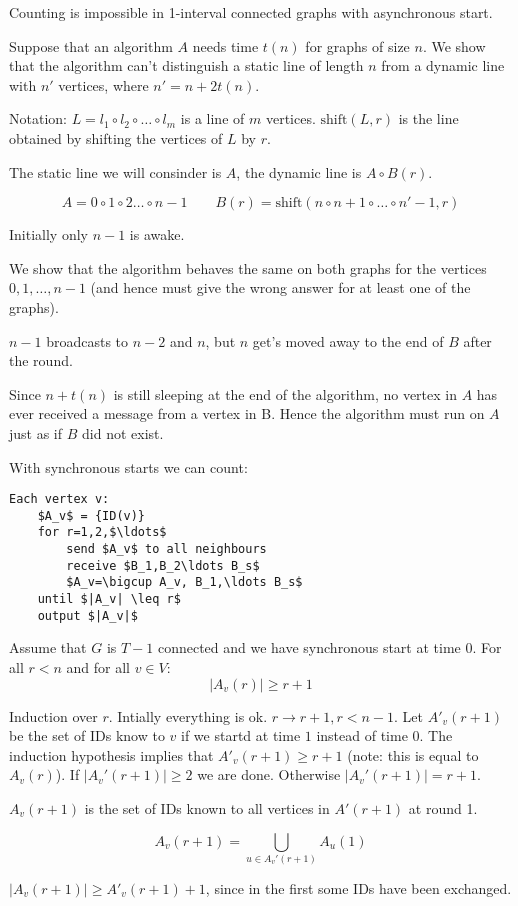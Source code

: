 \begin{thm} Counting is impossible in 1-interval connected graphs with asynchronous start.\end{thm}
\begin{pr} Suppose that an algorithm $A$ needs time $t(n)$ for graphs of size $n$. We show that the algorithm can't distinguish a static line of length $n$ from a dynamic line with $n'$ vertices, where $n'=n+2t(n)$.

Notation: $L=l_1\circ l_2\circ \ldots \circ l_m$ is a line of $m$ vertices. $\text{shift}(L,r)$ is the line obtained by shifting the vertices of $L$ by $r$.

The static line we will consinder is $A$, the dynamic line is $A\circ B(r)$.

\[A = 0\circ 1 \circ 2\ldots \circ n-1 \qquad B(r) = \text{shift}(n\circ n+1\circ \ldots \circ n'-1,r)\]

Initially only $n-1$ is awake.

We show that the algorithm behaves the same on both graphs for the vertices $0,1,\ldots ,n-1$ (and hence must give the wrong answer for at least one of the graphs).


$n-1$ broadcasts to $n-2$ and $n$, but $n$ get's moved away to the end of $B$ after the round.

Since $n+t(n)$ is still sleeping at the end of the algorithm, no vertex in $A$ has ever received a message from a vertex in B. Hence the algorithm must run on $A$ just as if $B$ did not exist.
\end{pr}

With synchronous starts we can count:

\begin{lstlisting}
Each vertex v:
	$A_v$ = {ID(v)}
	for r=1,2,$\ldots$
		send $A_v$ to all neighbours
		receive $B_1,B_2\ldots B_s$
		$A_v=\bigcup A_v, B_1,\ldots B_s$
	until $|A_v| \leq r$
	output $|A_v|$
\end{lstlisting}

\begin{lem} Assume that $G$ is $T-1$ connected and we have synchronous start at time $0$. For all $r<n$ and for all $v\in V$:
\[|A_v(r)| \geq r+1\]
\end{lem}

\begin{pr} Induction over $r$. Intially everything is ok. $r\rightarrow r+1, r<n-1$. Let $A'_v(r+1)$ be the set of IDs know to $v$ if we startd at time $1$ instead of time 0. The induction hypothesis implies that $A'_v(r+1)\geq r+1$ (note: this is equal to $A_v(r)$). If $|A_v'(r+1)|\geq 2$ we are done. Otherwise $|A_v'(r+1)|=r+1$. 

$A_v(r+1)$ is the set of IDs known to all vertices in $A'(r+1)$ at round 1.

\[A_v(r+1)=\bigcup_{u\in A_v'(r+1)} A_u(1)\]

$|A_v(r+1)|\geq A'_v(r+1)+1$, since in the first some IDs have been exchanged.
\end{pr}

